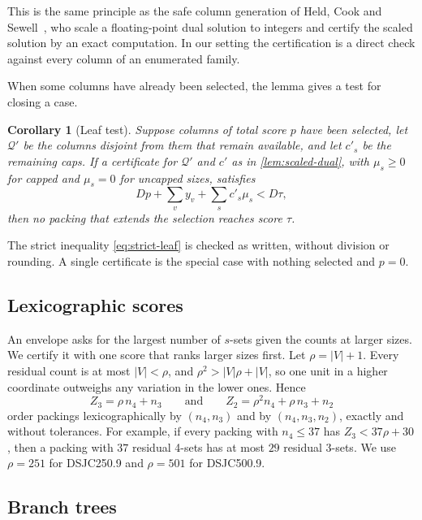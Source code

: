 \documentclass[11pt]{article}
\newtheorem{corollary}[theorem]{Corollary}
\theoremstyle{definition}
\newcommand{\DSJCTwoFifty}{\textnormal{\textsc{DSJC250.9}}}
\newcommand{\DSJCFiveHundred}{\textnormal{\textsc{DSJC500.9}}}
\begin{document}
This is the same principle as the safe column generation of Held, Cook and
Sewell~\cite{held2012}, who scale a floating-point dual solution to integers
and certify the scaled solution by an exact computation. In our setting the
certification is a direct check against every column of an enumerated family.

When some columns have already been selected, the lemma gives a test for
closing a case.

\begin{corollary}[Leaf test]
\label{cor:leaf}
Suppose columns of total score $p$ have been selected, let $\mathcal Q'$ be
the columns disjoint from them that remain available, and let $c'_s$ be the
remaining caps. If a certificate for $\mathcal Q'$ and $c'$ as in
\cref{lem:scaled-dual}, with $\mu_s\ge0$ for capped and $\mu_s=0$ for
uncapped sizes, satisfies
\begin{equation}
\label{eq:strict-leaf}
  Dp+\sum_vy_v+\sum_sc'_s\mu_s<D\tau,
\end{equation}
then no packing that extends the selection reaches score $\tau$.
\end{corollary}

The strict inequality \eqref{eq:strict-leaf} is checked as written, without
division or rounding. A single certificate is the special case with nothing
selected and $p=0$.

\subsection{Lexicographic scores}
\label{sec:lexicographic}

An envelope asks for the largest number of $s$-sets given the counts at
larger sizes. We certify it with one score that ranks larger sizes first. Let
$\rho=|V|+1$. Every residual count is at most $|V|<\rho$, and
$\rho^2>|V|\rho+|V|$, so one unit in a higher coordinate outweighs any
variation in the lower ones. Hence
\[
  Z_3=\rho\,n_4+n_3\qquad\text{and}\qquad Z_2=\rho^2n_4+\rho\,n_3+n_2
\]
order packings lexicographically by $(n_4,n_3)$ and by $(n_4,n_3,n_2)$,
exactly and without tolerances. For example, if every packing with
$n_4\le37$ has $Z_3<37\rho+30$, then a packing with $37$ residual 4-sets has
at most $29$ residual 3-sets. We use $\rho=251$ for \DSJCTwoFifty{} and
$\rho=501$ for \DSJCFiveHundred{}.

\subsection{Branch trees}
\label{sec:trees}
\end{document}
